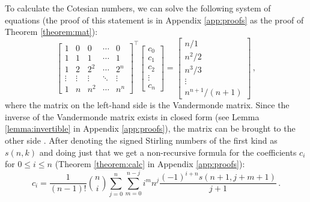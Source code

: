 To calculate the Cotesian numbers, we can solve the following system of equations (the proof of this statement is in Appendix \ref{app:proofs} as the proof of Theorem \ref{theorem:mat}):
\begin{equation}
    \begin{bmatrix}
        1&0&0&\cdots&0 \\
        1&1&1&\cdots&1 \\
        1&2&2^2&\cdots&2^n \\
        \vdots&\vdots & \vdots & \ddots & \vdots\\
        1&n&n^2&\cdots&n^n
    \end{bmatrix}^\top
    \begin{bmatrix}
        c_0\\
        c_1\\
        c_2\\
        \vdots \\
        c_n
    \end{bmatrix}
    =
    \begin{bmatrix}
        n/1 \\
        n^2/2 \\
        n^3/3 \\
        \vdots \\
        n^{n+1}/(n+1)
    \end{bmatrix} \,,\nonumber
\end{equation}
where the matrix on the left-hand side is the Vandermonde matrix.
Since the inverse of the Vandermonde matrix exists in closed form (see Lemma \ref{lemma:invertible} in Appendix \ref{app:proofs}), the matrix can be brought to the other side \cite{vandermonde_inv}.
After denoting the signed Stirling numbers of the first kind as $s(n, k)$ and doing just that we get a non-recursive formula for the coefficients $c_i$ for $0 \leq i \leq n$ (Theorem \ref{theorem:calc} in Appendix \ref{app:proofs}):
\begin{equation}
    c_i = \frac{1}{(n-1)!} \binom{n}{i} \sum_{j=0}^{n} \sum_{m=0}^{n-j} i^m n^{j} \frac{(-1)^{i+n} s(n+1, j+m+1) }{j+1} \,. \nonumber
\end{equation}
